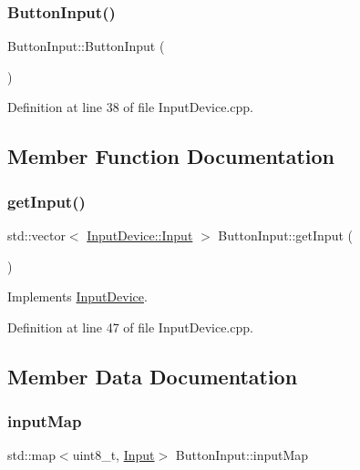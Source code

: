 \subsubsection{\texorpdfstring{Button\+Input()}{ButtonInput()}}
{\footnotesize\ttfamily Button\+Input\+::\+Button\+Input (\begin{DoxyParamCaption}{ }\end{DoxyParamCaption})}



Definition at line 38 of file Input\+Device.\+cpp.



\subsection{Member Function Documentation}
\mbox{\label{class_button_input_ab893731e65a4de626ad729cb9582da96}} 
\subsubsection{\texorpdfstring{get\+Input()}{getInput()}}
{\footnotesize\ttfamily std\+::vector$<$ \hyperlink{class_input_device_a75152d8f06b6d032036014e42e44688b}{Input\+Device\+::\+Input} $>$ Button\+Input\+::get\+Input (\begin{DoxyParamCaption}{ }\end{DoxyParamCaption})\hspace{0.3cm}{\ttfamily [virtual]}}



Implements \hyperlink{class_input_device_a946ae438b3a044741614493000aa216f}{Input\+Device}.



Definition at line 47 of file Input\+Device.\+cpp.



\subsection{Member Data Documentation}
\mbox{\label{class_button_input_a0913f24cb28e4c72063134e9c58450b2}} 
\subsubsection{\texorpdfstring{input\+Map}{inputMap}}
{\footnotesize\ttfamily std\+::map$<$uint8\+\_\+t, \hyperlink{class_input_device_a75152d8f06b6d032036014e42e44688b}{Input}$>$ Button\+Input\+::input\+Map\hspace{0.3cm}{\ttfamily [private]}}

